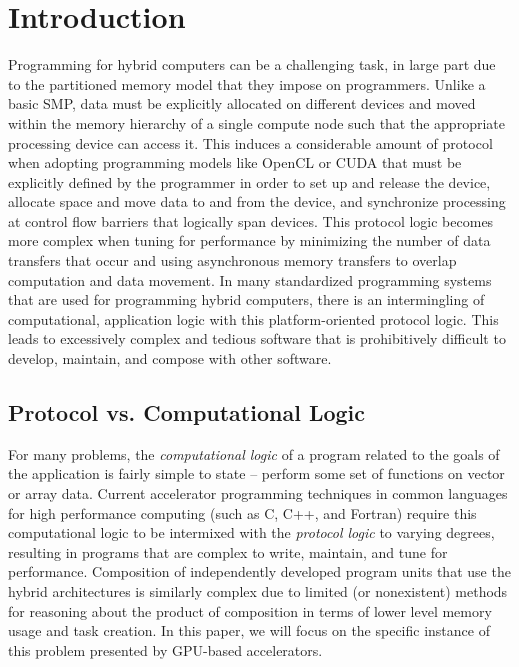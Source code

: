 
\section{Introduction}

Programming for hybrid computers can be a challenging task, in large part due to
the partitioned memory model that they impose on programmers. Unlike a basic
SMP, data must be explicitly allocated on different devices and moved within the
memory hierarchy of a single compute node such that the appropriate processing
device can access it. This induces a considerable amount of protocol when
adopting programming models like OpenCL or CUDA that must be explicitly defined
by the programmer in order to set up and release the device, allocate space and
move data to and from the device, and synchronize processing at control flow
barriers that logically span devices. This protocol logic becomes more complex
when tuning for performance by minimizing the number of data transfers that
occur and using asynchronous memory transfers to overlap computation and data
movement. In many standardized programming systems that are used for programming
hybrid computers, there is an intermingling of computational, application logic
with this platform-oriented protocol logic. This leads to excessively complex
and tedious software that is prohibitively difficult to develop, maintain, and
compose with other software.

\subsection{Protocol vs. Computational Logic}

For many problems, the \emph{computational logic} of a program related to the
goals of the application is fairly simple to state -- perform some set of
functions on vector or array data. Current accelerator programming techniques in
common languages for high performance computing (such as C, C++, and Fortran)
require this computational logic to be intermixed with the \emph{protocol logic}
to varying degrees, resulting in programs that are complex to write, maintain,
and tune for performance. Composition of independently developed program units
that use the hybrid architectures is similarly complex due to limited (or
nonexistent) methods for reasoning about the product of composition in terms of
lower level memory usage and task creation. In this paper, we will focus on the
specific instance of this problem presented by GPU-based accelerators.

